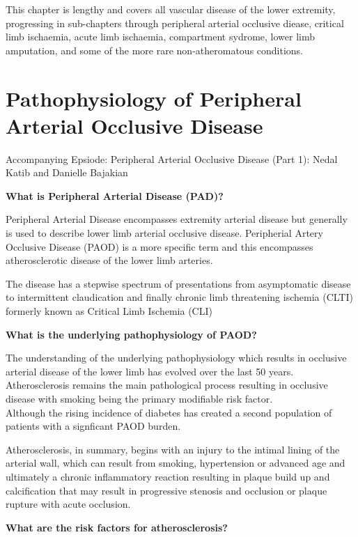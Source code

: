 \documentclass[
]{book}
\begin{document}
This chapter is lengthy and covers all vascular disease of the lower extremity,
progressing in sub-chapters through peripheral arterial occlusive diease, critical
limb ischaemia, acute limb ischaemia, compartment sydrome, lower limb amputation,
and some of the more rare non-atheromatous conditions.

\hypertarget{pathophysiology-of-peripheral-arterial-occlusive-disease}{%
\section{Pathophysiology of Peripheral Arterial Occlusive Disease}\label{pathophysiology-of-peripheral-arterial-occlusive-disease}}

Accompanying Epsiode:
Peripheral Arterial Occlusive Disease (Part 1): Nedal Katib and Danielle Bajakian

\textbf{What is Peripheral Arterial Disease (PAD)?}

Peripheral Arterial Disease encompasses extremity arterial disease but
generally is used to describe lower limb arterial occlusive disease.
Peripherial Artery Occlusive Disease (PAOD) is a more specific term
and this encompasses atherosclerotic disease of the lower limb arteries.

The disease has a stepwise spectrum of presentations from asymptomatic
disease to intermittent claudication and finally chronic limb
threatening ischemia (CLTI) formerly known as Critical Limb Ischemia
(CLI) \citep{aboyans2017ESCGuidelines2018}

\textbf{What is the underlying pathophysiology of PAOD?}

The understanding of the underlying pathophysiology which results in
occlusive arterial disease of the lower limb has evolved over the
last 50 years. Atherosclerosis remains the main pathological process resulting
in occlusive disease with smoking being the primary modifiable risk factor.\\
Although the rising incidence of diabetes has created a second population
of patients with a signficant PAOD burden.

Atherosclerosis, in summary, begins with an injury to the intimal lining
of the arterial wall, which can result from smoking, hypertension or
advanced age and ultimately a chronic inflammatory reaction resulting in
plaque build up and calcification that may result in progressive
stenosis and occlusion or plaque rupture with acute occlusion.

\textbf{What are the risk factors for atherosclerosis?}
\end{document}
